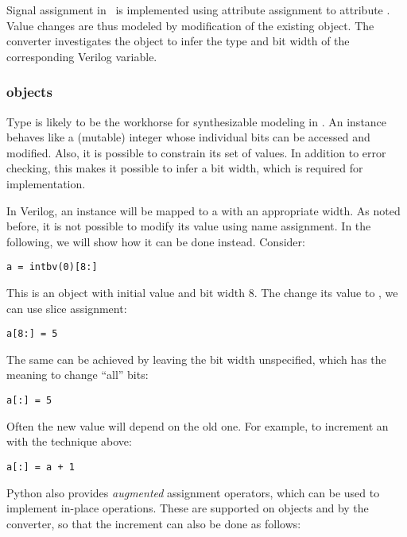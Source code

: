 Signal assignment in \myhdl\ is implemented using attribute assignment
to attribute .  Value changes are thus modeled by
modification of the existing object. The converter investigates the
 object to infer the type and bit width of the
corresponding Verilog variable.

\subsubsection{ objects\label{conv-meth-assign-intbv}}

Type  is likely to be the workhorse for synthesizable
modeling in \myhdl{}. An  instance behaves like a
(mutable) integer whose individual bits can be accessed and
modified. Also, it is possible to constrain its set of values. In
addition to error checking, this makes it possible to infer a bit
width, which is required for implementation.

In Verilog, an  instance will be mapped to a 
with an appropriate width. As noted before, it is not possible
to modify its value using name assignment. In the following, we
will show how it can be done instead. Consider:

\begin{verbatim}
a = intbv(0)[8:]
\end{verbatim}

This is an  object with initial value  and
bit width 8. The change its value to , we can use
slice assignment:

\begin{verbatim}
a[8:] = 5
\end{verbatim}

The same can be achieved by leaving the bit width unspecified, 
which has the meaning to change ``all'' bits:

\begin{verbatim}
a[:] = 5
\end{verbatim}

Often the new value will depend on the old one. For example,
to increment an  with the technique above:

\begin{verbatim}
a[:] = a + 1
\end{verbatim}

Python also provides \emph{augmented} assignment operators,
which can be used to implement in-place operations. These are supported
on  objects and by the converter, so that the increment
can also be done as follows:

